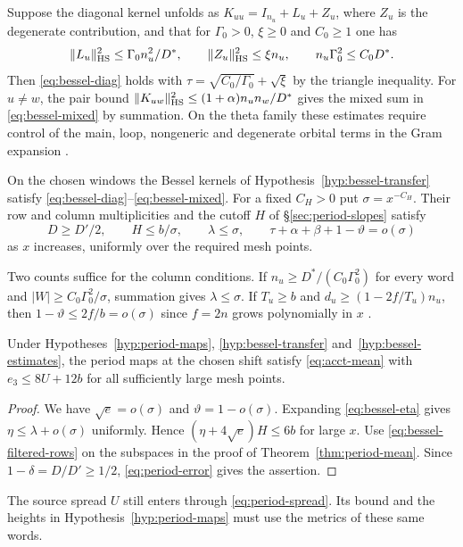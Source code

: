 Suppose the diagonal kernel unfolds as $K_{uu}=I_{n_u}+L_u+Z_u$,
where $Z_u$ is the degenerate contribution, and that for
$\Gamma_0>0$, $\xi\ge0$ and $C_0\ge1$ one has
\[
 \|L_u\|_{\rm HS}^2\le\Gamma_0 n_u^2/D^*,\qquad
 \|Z_u\|_{\rm HS}^2\le\xi n_u,\qquad
 n_u\Gamma_0^2\le C_0 D^* .
\]
Then \eqref{eq:bessel-diag} holds with
$\tau=\sqrt{C_0/\Gamma_0}+\sqrt\xi$ by the triangle inequality.
For $u\ne w$, the pair bound
$\|K_{uw}\|_{\rm HS}^2\le(1+\alpha)n_un_w/D^*$ gives the mixed sum
in \eqref{eq:bessel-mixed} by summation. On the theta family these
estimates require control of the main, loop, nongeneric and degenerate
orbital terms in the Gram expansion
\citep[Proposition~14.65 and Hypotheses~14.71--14.76]{adriazola-grh}.

\begin{hypothesis}[\openinput]\label{hyp:bessel-estimates}
On the chosen windows the Bessel kernels of
Hypothesis~\ref{hyp:bessel-transfer} satisfy
\eqref{eq:bessel-diag}--\eqref{eq:bessel-mixed}. For a fixed $C_H>0$
put $\sigma=x^{-C_H}$. Their row and column multiplicities and the
cutoff $H$ of \S\ref{sec:period-slopes} satisfy
\[
 D\ge D'/2,\qquad H\le b/\sigma,\qquad \lambda\le\sigma,\qquad
 \tau+\alpha+\beta+1-\vartheta=o(\sigma)
\]
as $x$ increases, uniformly over the required mesh points.
\end{hypothesis}

Two counts suffice for the column conditions. If
$n_u\ge D^*/(C_0\Gamma_0^2)$ for every word and
$|W|\ge C_0\Gamma_0^2/\sigma$, summation gives $\lambda\le\sigma$.
If $T_u\ge b$ and $d_u\ge(1-2f/T_u)n_u$, then
$1-\vartheta\le2f/b=o(\sigma)$ since $f=2n$ grows polynomially in $x$
\citep[Lemmas~13.12 and~13.19]{adriazola-grh}.

\begin{corollary}\label{cor:bessel-mean}
Under Hypotheses~\ref{hyp:period-maps}, \ref{hyp:bessel-transfer}
and~\ref{hyp:bessel-estimates}, the period maps at the chosen shift
satisfy \eqref{eq:acct-mean} with $e_3\le 8U+12b$ for all sufficiently
large mesh points.
\end{corollary}

\begin{proof}
We have $\sqrt e=o(\sigma)$ and $\vartheta=1-o(\sigma)$. Expanding
\eqref{eq:bessel-eta} gives $\eta\le\lambda+o(\sigma)$ uniformly.
Hence $(\eta+4\sqrt e)H\le6b$ for large $x$. Use
\eqref{eq:bessel-filtered-rows} on the subspaces in the proof of
Theorem~\ref{thm:period-mean}. Since $1-\delta=D/D'\ge1/2$,
\eqref{eq:period-error} gives the assertion.
\end{proof}

The source spread $U$ still enters through \eqref{eq:period-spread}.
Its bound and the heights in Hypothesis~\ref{hyp:period-maps} must
use the metrics of these same words.
